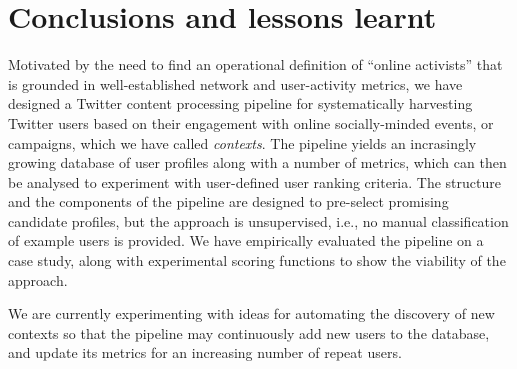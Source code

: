 \vspace{-10pt}
\section{Conclusions and lessons learnt}
\vspace{-10pt}


Motivated by the need to find an operational definition of ``online activists'' that is grounded in well-established network and user-activity metrics, we have designed a Twitter content processing pipeline for systematically harvesting Twitter users based on their engagement with online socially-minded events, or campaigns, which we have called \textit{contexts}.
The pipeline yields an incrasingly growing database of user profiles along with a number of metrics, which can then be analysed to experiment with user-defined user ranking criteria. The structure and the components of the pipeline are designed to pre-select promising candidate profiles, but the approach is unsupervised, i.e., no manual classification of example users is provided.
We have empirically evaluated the pipeline on a case study, along with experimental scoring functions to show the viability of the approach. 


We are currently experimenting with ideas for automating the discovery of new contexts so that the pipeline may continuously add new users to the database, and update its metrics for an increasing number of  repeat users.